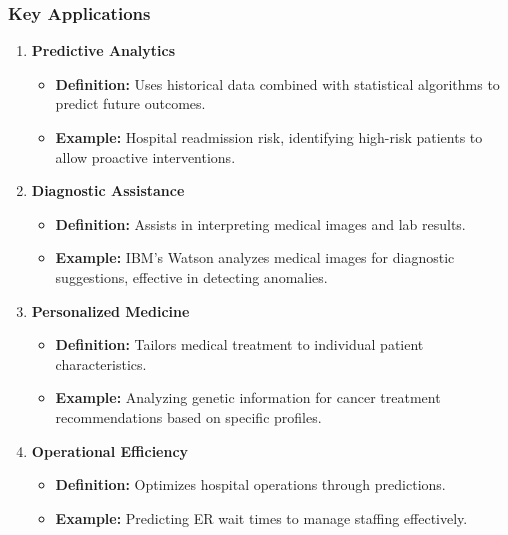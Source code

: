 \documentclass{beamer}
\begin{document}
\begin{frame}[fragile]
    \frametitle{Key Applications}
    \begin{enumerate}
        \item \textbf{Predictive Analytics}
        \begin{itemize}
            \item \textbf{Definition:} Uses historical data combined with statistical algorithms to predict future outcomes.
            \item \textbf{Example:} Hospital readmission risk, identifying high-risk patients to allow proactive interventions.
        \end{itemize}
        
        \item \textbf{Diagnostic Assistance}
        \begin{itemize}
            \item \textbf{Definition:} Assists in interpreting medical images and lab results.
            \item \textbf{Example:} IBM’s Watson analyzes medical images for diagnostic suggestions, effective in detecting anomalies.
        \end{itemize}
        
        \item \textbf{Personalized Medicine}
        \begin{itemize}
            \item \textbf{Definition:} Tailors medical treatment to individual patient characteristics.
            \item \textbf{Example:} Analyzing genetic information for cancer treatment recommendations based on specific profiles.
        \end{itemize}
        
        \item \textbf{Operational Efficiency}
        \begin{itemize}
            \item \textbf{Definition:} Optimizes hospital operations through predictions.
            \item \textbf{Example:} Predicting ER wait times to manage staffing effectively.
        \end{itemize}
    \end{enumerate}
\end{frame}
\end{document}
